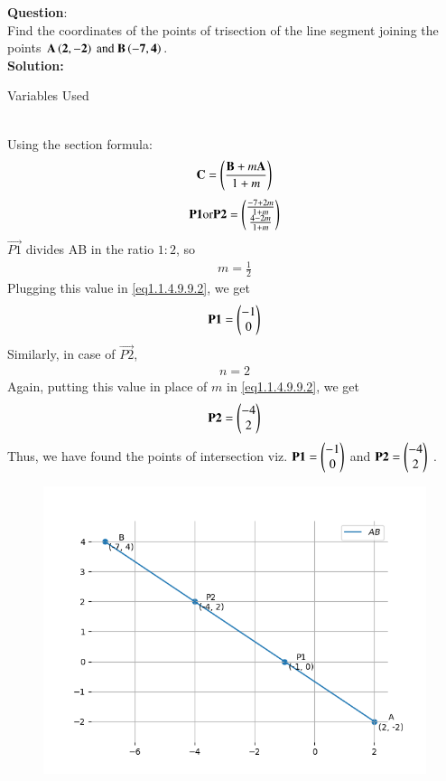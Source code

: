 \documentclass[journal]{IEEEtran}
\begin{document}
\textbf{Question}: \\
Find the coordinates of the points of trisection  of the line segment joining the points $\vec{A\brak{2,-2}\ \text{and}\ B\brak{-7,4}}$.
\\
\textbf{Solution: }
\begin{table}[h!]    
  \centering
  
  \caption{Variables Used}
  \label{tab1.1.4.9.9.1}
\end{table}
\\
Using the section formula:
\begin{align}
	\mathbf{C}=\left(\frac{\mathbf{B}+m\mathbf{A}}{1+m}\right) \label{eq1.1.4.9.9.1}
\end{align}
\begin{align}
	\mathbf{P1 \text{or} P2}= \begin{pmatrix}\frac{-7+2m}{1+m} \\ \frac{4-2m}{1+m}\end{pmatrix} \label{eq1.1.4.9.9.2}
\end{align}
$\vec{P1}$ divides AB in the ratio $1:2$, so 
\begin{align}
	m=\frac{1}{2}
\end{align}
Plugging this value in \ref{eq1.1.4.9.9.2}, we get
\begin{align}
	\mathbf{P1} = \begin{pmatrix}-1 \\ 0\end{pmatrix}
\end{align}
Similarly, in case of $\vec{P2}$,
\begin{align}
	n=2
\end{align}
Again, putting this value in place of $m$ in \ref{eq1.1.4.9.9.2}, we get
\begin{align}
	\mathbf{P2} = \begin{pmatrix}-4 \\ 2\end{pmatrix}
\end{align}
Thus, we have found the points of intersection viz. $\mathbf{P1} = \begin{pmatrix}-1 \\ 0\end{pmatrix}$ and $\mathbf{P2} = \begin{pmatrix}-4 \\ 2\end{pmatrix}$ . 
\begin{figure}[h]
	\centering
	\includegraphics[width=0.7\linewidth]{figs/fig1.png}
	\caption{}
	\label{graph}
\end{figure}
\end{document}
